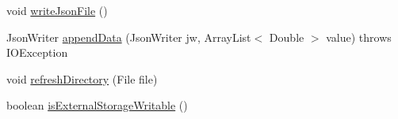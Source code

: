 \begin{DoxyCompactItemize}
\item 
void \hyperlink{classit_1_1unibo_1_1torsello_1_1bluetoothpositioning_1_1util_1_1ReportUtils_aa14b78ad82095e13e057308f4b5da594_aa14b78ad82095e13e057308f4b5da594}{write\+Json\+File} ()
\item 
Json\+Writer \hyperlink{classit_1_1unibo_1_1torsello_1_1bluetoothpositioning_1_1util_1_1ReportUtils_ad5cf6eb0aa41a0e3eeaabfec16f47c28_ad5cf6eb0aa41a0e3eeaabfec16f47c28}{append\+Data} (Json\+Writer jw, Array\+List$<$ Double $>$ value)  throws I\+O\+Exception 
\item 
void \hyperlink{classit_1_1unibo_1_1torsello_1_1bluetoothpositioning_1_1util_1_1ReportUtils_a5d2a51b68c3344f5aa41abaa118282b4_a5d2a51b68c3344f5aa41abaa118282b4}{refresh\+Directory} (File file)
\item 
boolean \hyperlink{classit_1_1unibo_1_1torsello_1_1bluetoothpositioning_1_1util_1_1ReportUtils_a58e7513f3cbe12723359b8dee541ed14_a58e7513f3cbe12723359b8dee541ed14}{is\+External\+Storage\+Writable} ()
\end{DoxyCompactItemize}
